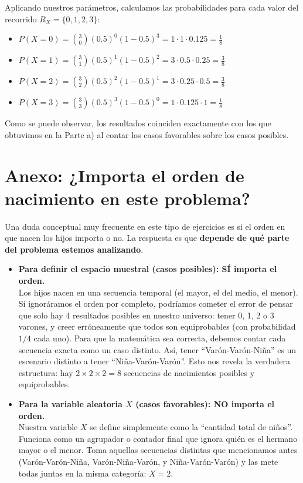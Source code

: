 \documentclass[11pt, a4paper]{article}
\begin{document}
Aplicando nuestros parámetros, calculamos las probabilidades para cada valor del recorrido $R_X = \{0, 1, 2, 3\}$:
\begin{itemize}
    \item $P(X=0) = \binom{3}{0} (0.5)^0 (1-0.5)^{3} = 1 \cdot 1 \cdot 0.125 = \frac{1}{8}$
    \item $P(X=1) = \binom{3}{1} (0.5)^1 (1-0.5)^{2} = 3 \cdot 0.5 \cdot 0.25 = \frac{3}{8}$
    \item $P(X=2) = \binom{3}{2} (0.5)^2 (1-0.5)^{1} = 3 \cdot 0.25 \cdot 0.5 = \frac{3}{8}$
    \item $P(X=3) = \binom{3}{3} (0.5)^3 (1-0.5)^{0} = 1 \cdot 0.125 \cdot 1 = \frac{1}{8}$
\end{itemize}

Como se puede observar, los resultados coinciden exactamente con los que obtuvimos en la Parte a) al contar los casos favorables sobre los casos posibles.

\vspace{0.5cm}

\section*{Anexo: ¿Importa el orden de nacimiento en este problema?}

Una duda conceptual muy frecuente en este tipo de ejercicios es si el orden en que nacen los hijos importa o no. La respuesta es que \textbf{depende de qué parte del problema estemos analizando}.

\begin{itemize}
    \item \textbf{Para definir el espacio muestral (casos posibles): SÍ importa el orden.} \\
    Los hijos nacen en una secuencia temporal (el mayor, el del medio, el menor). Si ignoráramos el orden por completo, podríamos cometer el error de pensar que solo hay 4 resultados posibles en nuestro universo: tener 0, 1, 2 o 3 varones, y creer erróneamente que todos son equiprobables (con probabilidad $1/4$ cada uno). Para que la matemática sea correcta, debemos contar cada secuencia exacta como un caso distinto. Así, tener ``Varón-Varón-Niña'' es un escenario distinto a tener ``Niña-Varón-Varón''. Esto nos revela la verdadera estructura: hay $2 \times 2 \times 2 = 8$ secuencias de nacimientos posibles y equiprobables.
    
    \item \textbf{Para la variable aleatoria $X$ (casos favorables): NO importa el orden.} \\
    Nuestra variable $X$ se define simplemente como la ``cantidad total de niños''. Funciona como un agrupador o contador final que ignora quién es el hermano mayor o el menor. Toma aquellas secuencias distintas que mencionamos antes (Varón-Varón-Niña, Varón-Niña-Varón, y Niña-Varón-Varón) y las mete todas juntas en la misma categoría: $X = 2$.
\end{itemize}
\end{document}
